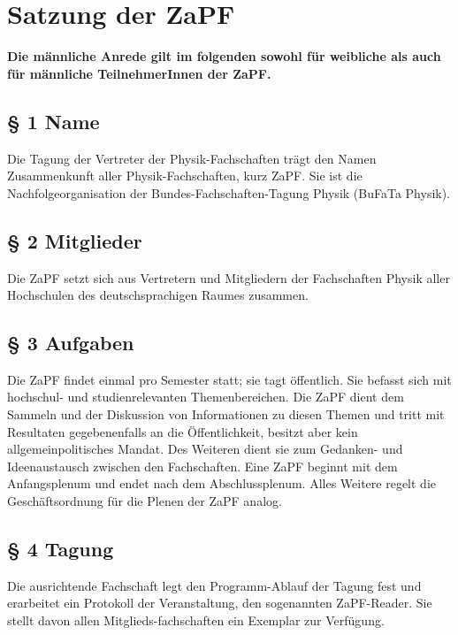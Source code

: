 



\chapter*{Satzung der ZaPF}

\textbf{Die männliche Anrede gilt im folgenden sowohl für weibliche
als auch für männliche
 TeilnehmerInnen der ZaPF.}

\section*{§ 1 Name}
Die Tagung der Vertreter der Physik-Fachschaften trägt den Namen
Zusammenkunft aller Physik-Fachschaften, kurz ZaPF. Sie ist die
Nachfolgeorganisation der Bundes-Fachschaften-Tagung Physik (BuFaTa
Physik).

\section*{§ 2 Mitglieder}
Die ZaPF setzt sich aus Vertretern und Mitgliedern der Fachschaften Physik aller Hochschulen
des deutschsprachigen Raumes zusammen.

\section*{§ 3 Aufgaben}
Die ZaPF findet einmal pro Semester statt; sie tagt öffentlich. Sie
befasst sich mit hochschul- und studienrelevanten Themenbereichen.
Die ZaPF dient dem Sammeln und der Diskussion von Informationen zu
diesen Themen und tritt mit Resultaten gegebenenfalls an die
Öffentlichkeit, besitzt aber kein allgemeinpolitisches Mandat. Des
Weiteren dient sie zum Gedanken- und Ideenaustausch zwischen den
Fachschaften. Eine ZaPF beginnt mit dem Anfangsplenum und endet nach
dem Abschlussplenum. Alles Weitere regelt die
Geschäftsordnung für die Plenen der ZaPF analog.

\section*{§ 4 Tagung}
Die ausrichtende Fachschaft legt den Programm-Ablauf der Tagung fest und erarbeitet ein Protokoll der Veranstaltung,
den sogenannten ZaPF-Reader. Sie stellt davon allen Mitglieds-fachschaften ein Exemplar zur Verfügung.

\newpage
